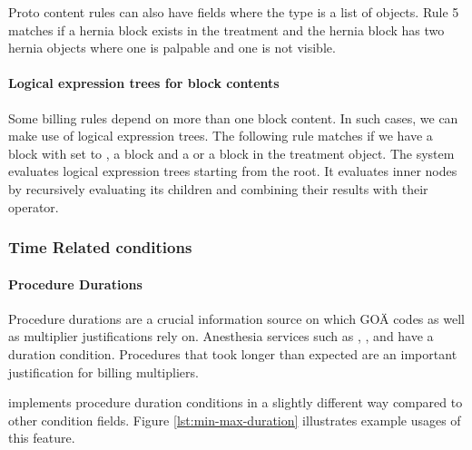 Proto content rules can also have fields where the type is a list of objects.
Rule 5 matches if a hernia block exists in the treatment and the hernia block has two hernia objects where one is palpable and one is not visible.



\paragraph{Logical expression trees for block contents}
Some billing rules depend on more than one block content.
In such cases, we can make use of logical expression trees.
The following rule matches if we have a  block with  set to \true,
a  block and a  or a  block in the treatment object.
The system evaluates logical expression trees starting from the root.
It evaluates inner nodes by recursively evaluating its children and combining their results with their operator.



\subsubsection{Time Related conditions}

\paragraph{Procedure Durations}
Procedure durations are a crucial information source on which GOÄ codes as well as multiplier justifications rely on.
Anesthesia services such as , ,  and  have a duration condition.
Procedures that took longer than expected are an important justification for billing multipliers.

\RL implements procedure duration conditions in a slightly different way compared to other condition fields.
Figure \ref{lst:min-max-duration} illustrates example usages of this feature.



